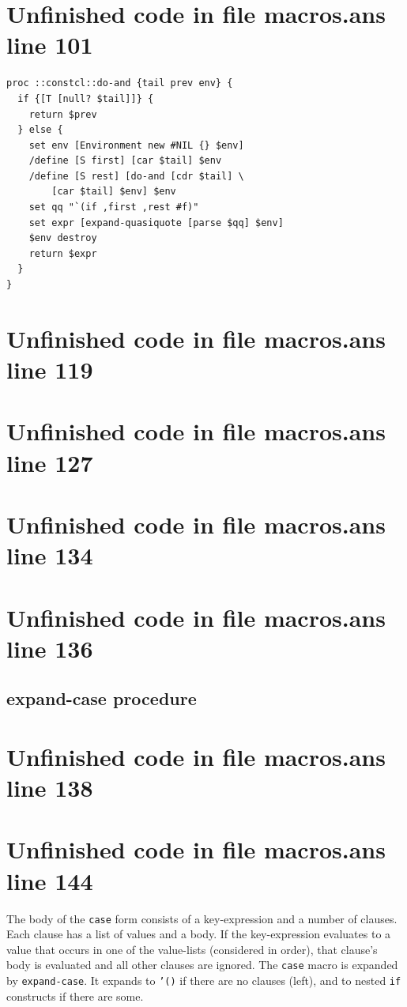 \documentclass[twoside,9pt]{report}
\begin{document}
\section{Unfinished code in file macros.ans line 101}
\begin{lstlisting}
proc ::constcl::do-and {tail prev env} {
  if {[T [null? $tail]]} {
    return $prev
  } else {
    set env [Environment new #NIL {} $env]
    /define [S first] [car $tail] $env
    /define [S rest] [do-and [cdr $tail] \
        [car $tail] $env] $env
    set qq "`(if ,first ,rest #f)"
    set expr [expand-quasiquote [parse $qq] $env]
    $env destroy
    return $expr
  }
}
\end{lstlisting}
\section{Unfinished code in file macros.ans line 119}
\section{Unfinished code in file macros.ans line 127}
\section{Unfinished code in file macros.ans line 134}
\section{Unfinished code in file macros.ans line 136}
\subsection{expand-case procedure}
\label{expand-case-procedure}
\section{Unfinished code in file macros.ans line 138}

\section{Unfinished code in file macros.ans line 144}

The body of the \texttt{case} form consists of a key-expression and a number of clauses. Each clause has a list of values and a body. If the key-expression evaluates to a value that occurs in one of the value-lists (considered in order), that clause's body is evaluated and all other clauses are ignored. The \texttt{case} macro is expanded by \texttt{expand-case}. It expands to \texttt{'()} if there are no clauses (left), and to nested \texttt{if} constructs if there are some.
\end{document}
